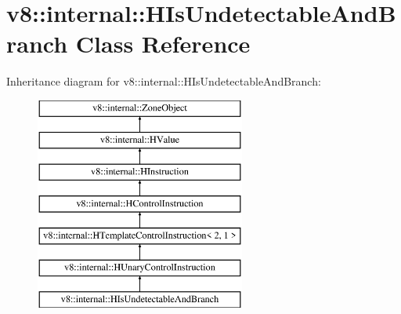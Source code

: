 \hypertarget{classv8_1_1internal_1_1_h_is_undetectable_and_branch}{}\section{v8\+:\+:internal\+:\+:H\+Is\+Undetectable\+And\+Branch Class Reference}
\label{classv8_1_1internal_1_1_h_is_undetectable_and_branch}
Inheritance diagram for v8\+:\+:internal\+:\+:H\+Is\+Undetectable\+And\+Branch\+:\begin{figure}[H]
\begin{center}
\leavevmode
\includegraphics[height=7.000000cm]{classv8_1_1internal_1_1_h_is_undetectable_and_branch}
\end{center}
\end{figure}
